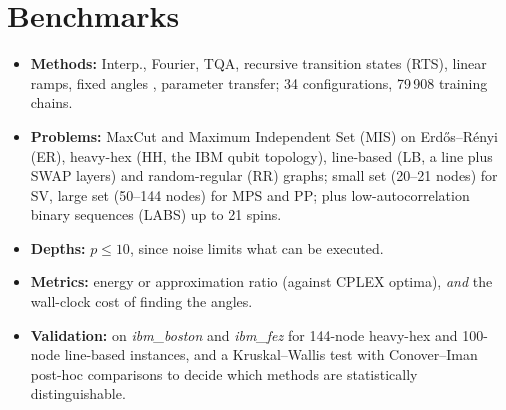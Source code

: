 \documentclass[handoutsbeamer.tex]{subfiles}
\begin{document}
\section{Benchmarks}

\begin{frame}
\begin{itemize}\setlength\itemsep{0.2em}
    \item \textbf{Methods:} Interp., Fourier, TQA, recursive transition states (RTS), linear ramps, fixed angles \citep{Wurtz2021}, parameter transfer; 34 configurations, 79\,908 training chains.
    \item \textbf{Problems:} MaxCut and Maximum Independent Set (MIS) on Erd\H{o}s--R\'enyi (ER), heavy-hex (HH, the IBM qubit topology), line-based (LB, a line plus SWAP layers) and random-regular (RR) graphs; small set (20--21 nodes) for SV, large set (50--144 nodes) for MPS and PP; plus low-autocorrelation binary sequences (LABS) up to 21 spins.
    \item \textbf{Depths:} $p \le 10$, since noise limits what can be executed.
    \item \textbf{Metrics:} energy or approximation ratio (against CPLEX optima), \emph{and} the wall-clock cost of finding the angles.
    \item \textbf{Validation:} on \emph{ibm\_boston} and \emph{ibm\_fez} for 144-node heavy-hex and 100-node line-based instances, and a Kruskal--Wallis test with Conover--Iman post-hoc comparisons to decide which methods are statistically distinguishable.
\end{itemize}
\end{frame}
\end{document}

